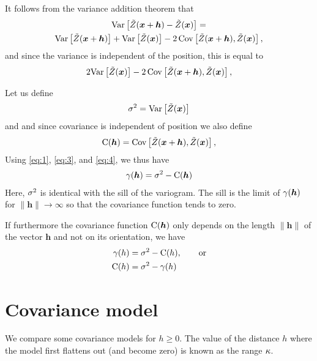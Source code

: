 \documentclass[11pt,a4paper]{amsart}
\begin{document}
It follows from the variance addition theorem \cite{pap91:pro} that
\begin{multline}
  \label{eq:3}
  \text{Var}
   \left[
   \tilde{Z}(\boldsymbol{x}+\boldsymbol{h}) - \tilde{Z}(\boldsymbol{x})
   \right]
  =\\
   \text{Var}
   \left[
   \tilde{Z}(\boldsymbol{x}+\boldsymbol{h})
  \right] +
     \text{Var}
   \left[
   \tilde{Z}(\boldsymbol{x})
  \right] - 2 \operatorname{Cov} 
  \left[
  \tilde{Z}(\boldsymbol{x}+\boldsymbol{h}), \tilde{Z}(\boldsymbol{x})
  \right],
\end{multline}
and since the variance is independent of the position, this is equal to
\begin{align}
  \label{eq:4}
  2 \text{Var}
   \left[
   \tilde{Z}(\boldsymbol{x})
  \right] - 2\operatorname{Cov} 
  \left[
  \tilde{Z}(\boldsymbol{x}+\boldsymbol{h}), \tilde{Z}(\boldsymbol{x})
  \right],
\end{align}

Let us define
\begin{align}
  \label{eq:5}
  \sigma^2 = \text{Var}
  \left[
  \tilde{Z}(\boldsymbol{x})
  \right]
\end{align}
and and since covariance is independent of position we also define
\begin{align}
  \label{eq:6}
  \operatorname{C}(\boldsymbol{h}) = \operatorname{Cov}
  \left[
  \tilde{Z}(\boldsymbol{x}+\boldsymbol{h}), \tilde{Z}(\boldsymbol{x})
  \right],
\end{align}
Using \eqref{eq:1}, \eqref{eq:3}, and \eqref{eq:4}, we thus have
\begin{align}
  \label{eq:7}
  \gamma(\boldsymbol{h}) = \sigma^2 -  \operatorname{C}(\boldsymbol{h})
\end{align}
Here, $\sigma^2$ is identical with the sill of the variogram.
The sill is the limit of $\gamma(\boldsymbol{h})$
for $\|\boldsymbol{h}\| \rightarrow \infty$
so that the covariance function tends to zero.

If furthermore the covariance function $\operatorname{C}(\boldsymbol{h})$
only depends on the length $\|\boldsymbol{h}\|$ 
of the vector $\boldsymbol{h}$ and not on its orientation, we have
\begin{align}
  \label{eq:15}
  \gamma(h) &= \sigma^2 -  \operatorname{C}(h), \qquad \text{or}\\
  \label{eq:8}
  \operatorname{C}(h) &= \sigma^2 -  \gamma(h)
\end{align}
\section{Covariance model}
We compare some covariance models for $h\geq 0$.
The value of the distance $h$ where the model first flattens out (and become
zero) is known as the range $\kappa$.
\end{document}
